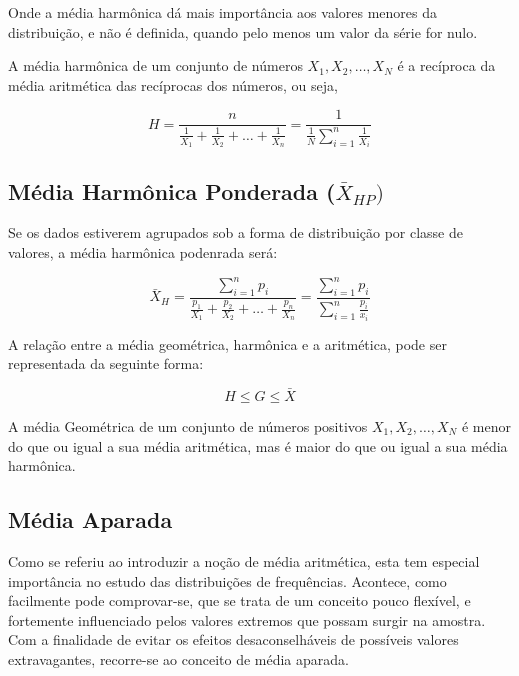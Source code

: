 Onde a média harmônica dá mais importância aos valores menores da distribuição, e não é definida, quando pelo menos um valor da série for nulo.\vskip0.3cm


A média harmônica de um conjunto de números $X_{1},X_{2},\ldots,X_{N}$ é a recíproca da média
aritmética das recíprocas dos números, ou seja,

\begin{equation}\label{harmonica}
    H=\frac{n}{\frac{1}{X_{1}}+\frac{1}{X_{2}}+\ldots+\frac{1}{X_{n}}}=\frac{1}{\frac{1}{N}\sum_{i=1}^{n}\frac{1}{X_{i}}}
    \end{equation}

\subsection{Média Harmônica Ponderada ($\bar{X}_{HP})$}


Se os dados estiverem agrupados sob a forma de distribuição por classe de valores, a média harmônica podenrada será:


\begin{equation}\label{harmonicapondrada}
    \bar{X}_{H}=\frac{\sum_{i=1}^{n}p_{i}}{\frac{p_{1}}{X_{1}}+\frac{p_{2}}{X_{2}}+\ldots+\frac{p_{n}}{X_{n}}}=\frac{\sum_{i=1}^{n}p_{i}}{\sum_{i=1}^{n}\frac{p_{i}}{x_{i}}}
\end{equation}


A relação entre a média geométrica, harmônica e a aritmética, pode ser representada da seguinte forma:

        $$ H \leq G \leq \bar{X}  $$

A média Geométrica de um conjunto de números positivos $X_{1},X_{2},\ldots,X_{N}$ é menor do que ou igual a sua média aritmética, mas é maior do que ou igual a sua média harmônica.


\subsection{Média Aparada}


\inic Como se referiu ao introduzir a noção de média aritmética, esta tem especial
importância no estudo das distribuições de frequências.
Acontece, como facilmente pode comprovar-se, que se trata de um conceito
pouco flexível, e fortemente influenciado pelos valores extremos que possam surgir na
amostra. Com a finalidade de evitar os efeitos desaconselháveis de possíveis valores
extravagantes, recorre-se ao conceito de média aparada. \vskip0.3cm


